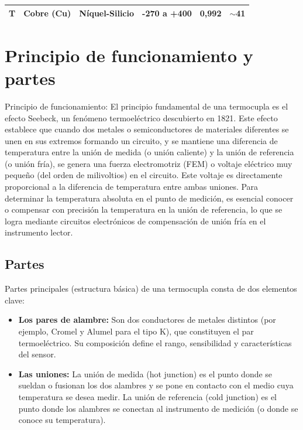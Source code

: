 \begin{table}[h]
\begin{tabular}{|c|ll|c|c|c|}
		\textbf{T}                                                                    & \multicolumn{1}{l|}{Cobre (Cu)}                                                                  & Níquel-Silicio                         & -270 a +400                                                                         & 0,992                                                                                  & $\sim$41                                                                                       \\ \hline
	\end{tabular}
\end{table}

\section*{Principio de funcionamiento y partes}

Principio de funcionamiento: El principio fundamental de una termocupla es el efecto Seebeck, un fenómeno termoeléctrico descubierto en 1821. Este efecto establece que cuando dos metales o semiconductores de materiales diferentes se unen en sus extremos formando un circuito, y se mantiene una diferencia de temperatura entre la unión de medida (o unión caliente) y la unión de referencia (o unión fría), se genera una fuerza electromotriz (FEM) o voltaje eléctrico muy pequeño (del orden de milivoltios) en el circuito. Este voltaje es directamente proporcional a la diferencia de temperatura entre ambas uniones. Para determinar la temperatura absoluta en el punto de medición, es esencial conocer o compensar con precisión la temperatura en la unión de referencia, lo que se logra mediante circuitos electrónicos de compensación de unión fría en el instrumento lector.

\subsection*{Partes}
Partes principales (estructura básica) de una termocupla consta de dos elementos clave:

\begin{itemize}
	\item \textbf{Los pares de alambre:} Son dos conductores de metales distintos (por ejemplo, Cromel y Alumel para el tipo K), que constituyen el par termoeléctrico. Su composición define el rango, sensibilidad y características del sensor.
	
	\item \textbf{Las uniones:} La unión de medida (hot junction) es el punto donde se sueldan o fusionan los dos alambres y se pone en contacto con el medio cuya temperatura se desea medir. La unión de referencia (cold junction) es el punto donde los alambres se conectan al instrumento de medición (o donde se conoce su temperatura).
\end{itemize}